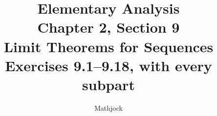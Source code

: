 
\title{\textbf{Elementary Analysis}\\[0.3em]
Chapter 2, Section 9\\[0.3em]
\large Limit Theorems for Sequences\\
Exercises 9.1--9.18, with every subpart}
\author{Mathjock}
\date{}

\maketitle
\bookinfo
\tableofcontents
\clearpage
\setcounter{section}{8}


